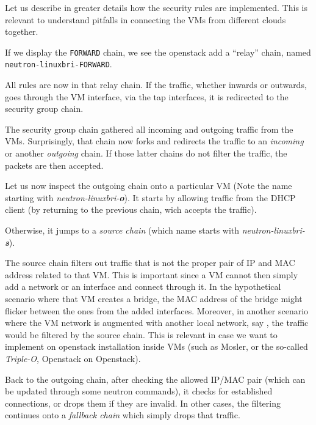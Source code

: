 Let us describe in greater details how the security rules are
implemented. This is relevant to understand pitfalls in connecting the
VMs from different clouds together.

If we display the \texttt{FORWARD} chain, we see the openstack add a
``relay'' chain, named \texttt{neutron-linuxbri-FORWARD}.


All rules are now in that relay chain. If the traffic, whether inwards
or outwards, goes through the VM interface, via the tap interfaces, it
is redirected to the security group chain.


The security group chain gathered all incoming and outgoing traffic
from the VMs. Surprisingly, that chain now forks and redirects the
traffic to an \emph{incoming} or another \emph{outgoing} chain. If
those latter chains do not filter the traffic, the packets are then
accepted.


Let us now inspect the outgoing chain onto a particular VM (Note the
name starting with \emph{neutron-linuxbri-\textbf{o}}). It starts by
allowing traffic from the DHCP client (by returning to the previous
chain, wich accepts the traffic).


Otherwise, it jumps to a \emph{source chain} (which name starts with \emph{neutron-linuxbri-\textbf{s}}).


The source chain filters out traffic that is not the proper pair of IP
and MAC address related to that VM. This is important since a VM
cannot then simply add a network or an interface and connect through
it. In the hypothetical scenario where that VM creates a bridge, the
MAC address of the bridge might flicker between the ones from the
added interfaces. Moreover, in another scenario where the VM network
is augmented with another local network, say , the
traffic would be filtered by the source chain. This is relevant in
case we want to implement on openstack installation inside VMs (such
as Mosler, or the so-called \emph{Triple-O}, Openstack on Openstack).

Back to the outgoing chain, after checking the allowed IP/MAC pair
(which can be updated through some neutron commands), it checks for
established connections, or drops them if they are invalid. In other
cases, the filtering continues onto a \emph{fallback chain} which
simply drops that traffic.

